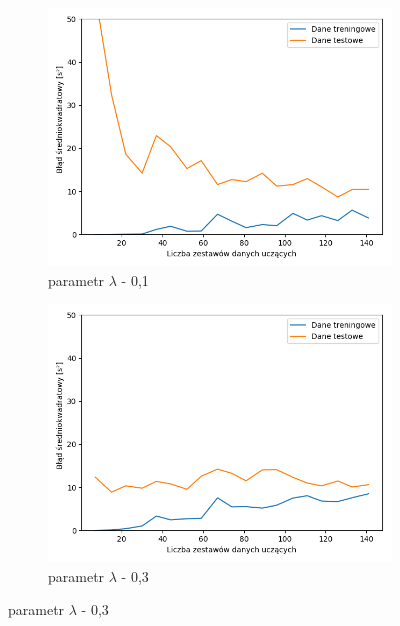 \documentclass[12pt]{aghdpl}
\begin{document}
		\begin{figure}[h]
		 	\begin{subfigure}{.5\linewidth}
		 		\includegraphics[width =\linewidth]{wykresy/7_badanie_danych/l2/regularyzacja_0_1_learning_curves.png}
		 		\caption{parametr $\lambda$ - 0,1}
		 	\end{subfigure}
		 	\begin{subfigure}{.5\linewidth}
		 		\includegraphics[width =\linewidth]{wykresy/7_badanie_danych/l2/regularyzacja_0_3_learning_curves.png}
		 		\caption{parametr $\lambda$ - 0,3}
		 	\end{subfigure}
		 	

\end{figure}
\end{document}
